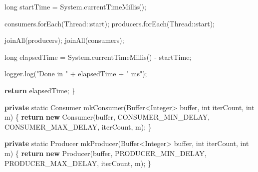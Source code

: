 \documentclass[11pt]{article}
\newenvironment{Shaded}{}{}
\newcommand{\KeywordTok}[1]{\textcolor[rgb]{0.00,0.44,0.13}{\textbf{{#1}}}}
\newcommand{\DataTypeTok}[1]{\textcolor[rgb]{0.56,0.13,0.00}{{#1}}}
\newcommand{\StringTok}[1]{\textcolor[rgb]{0.25,0.44,0.63}{{#1}}}
\newcommand{\FunctionTok}[1]{\textcolor[rgb]{0.02,0.16,0.49}{{#1}}}
\newcommand{\NormalTok}[1]{{#1}}
\newcommand{\ControlFlowTok}[1]{\textcolor[rgb]{0.00,0.44,0.13}{\textbf{{#1}}}}
\newcommand{\OperatorTok}[1]{\textcolor[rgb]{0.40,0.40,0.40}{{#1}}}
\newcommand{\BuiltInTok}[1]{{#1}}
\begin{document}
\begin{Shaded}
\begin{Highlighting}[]
        \DataTypeTok{long}\NormalTok{ startTime }\OperatorTok{=} \BuiltInTok{System}\OperatorTok{.}\FunctionTok{currentTimeMillis}\OperatorTok{();}

\NormalTok{        consumers}\OperatorTok{.}\FunctionTok{forEach}\OperatorTok{(}\BuiltInTok{Thread}\OperatorTok{::}\NormalTok{start}\OperatorTok{);}
\NormalTok{        producers}\OperatorTok{.}\FunctionTok{forEach}\OperatorTok{(}\BuiltInTok{Thread}\OperatorTok{::}\NormalTok{start}\OperatorTok{);}

        \FunctionTok{joinAll}\OperatorTok{(}\NormalTok{producers}\OperatorTok{);}
        \FunctionTok{joinAll}\OperatorTok{(}\NormalTok{consumers}\OperatorTok{);}

        \DataTypeTok{long}\NormalTok{ elapsedTime }\OperatorTok{=} \BuiltInTok{System}\OperatorTok{.}\FunctionTok{currentTimeMillis}\OperatorTok{()} \OperatorTok{{-}}\NormalTok{ startTime}\OperatorTok{;}

\NormalTok{        logger}\OperatorTok{.}\FunctionTok{log}\OperatorTok{(}\StringTok{"Done in "} \OperatorTok{+}\NormalTok{ elapsedTime }\OperatorTok{+} \StringTok{" ms"}\OperatorTok{);}

        \ControlFlowTok{return}\NormalTok{ elapsedTime}\OperatorTok{;}
    \OperatorTok{\}}

    \KeywordTok{private} \DataTypeTok{static}\NormalTok{ Consumer }\FunctionTok{mkConsumer}\OperatorTok{(}\BuiltInTok{Buffer}\OperatorTok{\textless{}}\BuiltInTok{Integer}\OperatorTok{\textgreater{}}\NormalTok{ buffer}\OperatorTok{,} \DataTypeTok{int}\NormalTok{ iterCount}\OperatorTok{,} \DataTypeTok{int}\NormalTok{ m}\OperatorTok{)} \OperatorTok{\{}
        \ControlFlowTok{return} \KeywordTok{new} \FunctionTok{Consumer}\OperatorTok{(}\NormalTok{buffer}\OperatorTok{,}\NormalTok{ CONSUMER\_MIN\_DELAY}\OperatorTok{,}\NormalTok{ CONSUMER\_MAX\_DELAY}\OperatorTok{,}\NormalTok{ iterCount}\OperatorTok{,}\NormalTok{ m}\OperatorTok{);}
    \OperatorTok{\}}

    \KeywordTok{private} \DataTypeTok{static}\NormalTok{ Producer }\FunctionTok{mkProducer}\OperatorTok{(}\BuiltInTok{Buffer}\OperatorTok{\textless{}}\BuiltInTok{Integer}\OperatorTok{\textgreater{}}\NormalTok{ buffer}\OperatorTok{,} \DataTypeTok{int}\NormalTok{ iterCount}\OperatorTok{,} \DataTypeTok{int}\NormalTok{ m}\OperatorTok{)} \OperatorTok{\{}
        \ControlFlowTok{return} \KeywordTok{new} \FunctionTok{Producer}\OperatorTok{(}\NormalTok{buffer}\OperatorTok{,}\NormalTok{ PRODUCER\_MIN\_DELAY}\OperatorTok{,}\NormalTok{ PRODUCER\_MAX\_DELAY}\OperatorTok{,}\NormalTok{ iterCount}\OperatorTok{,}\NormalTok{ m}\OperatorTok{);}
    \OperatorTok{\}}


\end{Highlighting}
\end{Shaded}
\end{document}
